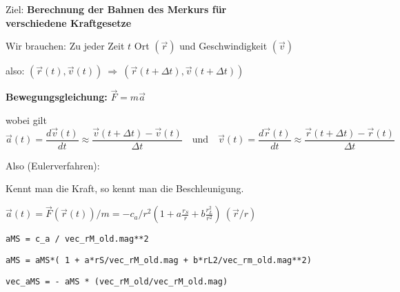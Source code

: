 \documentclass[a4paper, 14pt, fleqn, notitlepage]{scrartcl}
\begin{document}
\vspace{1em}
\begin{center}
  \color{black!50!white}{\rule{\textwidth}{1pt}}
\end{center}
\vspace{-1.5em}
\begin{minipage}[t]{\paperwidth}
{\Large Ziel: {\bf Berechnung der Bahnen des Merkurs f\"ur \\ {\phantom{Ziel:}}verschiedene Kraftgesetze}}

\vspace{0.5cm}

Wir brauchen: Zu jeder Zeit $t$ Ort $(\vec r)$ und Geschwindigkeit $(\vec v)$

\vspace{0.5cm}

also: $(\vec r(t),\vec v(t))\ \Longrightarrow \ (\vec r(t+\Delta t),\vec v(t+\Delta t))$

\vspace{0.5cm}


 {\bf Bewegungsgleichung:}  ${\vec{F} = m \vec{a}}$

\vspace{0.5cm}
wobei gilt
$$
    \vec{a}(t) = \frac{d\vec{v}(t)}{dt} \approx \frac{\vec{v}(t + \Delta t) - \vec{v}(t)}{\Delta t}\quad \mbox{und}\quad
    \vec{v}(t) = \frac{d\vec{r}(t)}{dt} \approx \frac{\vec{r}(t + \Delta t) - \vec{r}(t)}{\Delta t}
 $$

\vspace{0.5cm}

 Also (Eulerverfahren): 
 
\vspace{0.9cm}

 Kennt man die Kraft, so kennt man die Beschleunigung. 
  
\vspace{0.4cm}

\hspace{2cm}  $\vec{a}(t) = \vec{F}(\vec{r}(t)) / m = -c_a/r^2  \left(1 + a \frac{r_S}{r} + b \frac{r_L^2}{r^2}\right) \ (\vec r/r)$ 
  
\vspace{0.4cm}

\hspace{3.0cm} {\tt aMS = c\_a / vec\_rM\_old.mag**2 }

\hspace{3.0cm} {\tt aMS = aMS*( 1 + a*rS/vec\_rM\_old.mag + b*rL2/vec\_rm\_old.mag**2) }
  
\hspace{3.0cm} {\tt vec\_aMS = -  aMS * (vec\_rM\_old/vec\_rM\_old.mag)}
  

\end{minipage}
\end{document}
